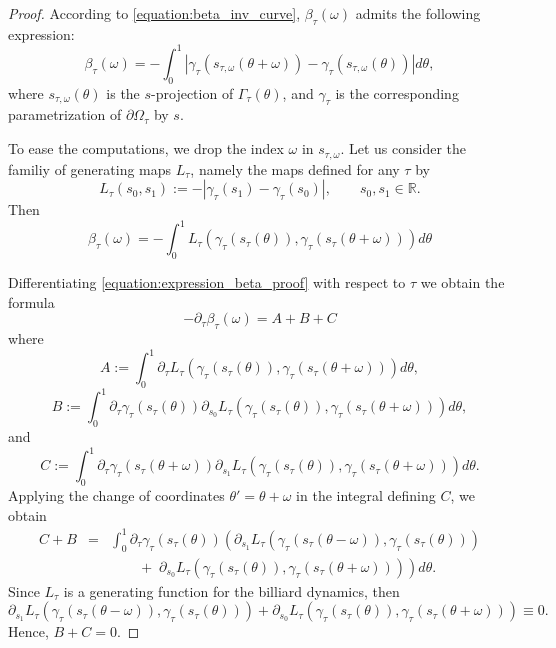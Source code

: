 \documentclass[10pt,a4paper]{amsart}
\newcommand{\RR}{\mathbb{R}}
\begin{document}
\begin{proof}%
According to \eqref{equation:beta_inv_curve}, $\beta_{\tau}(\omega)$ admits the following expression:
\[
\beta_{\tau}(\omega) = -\int_0^1|\gamma_{\tau}(s_{\tau,\omega}(\theta+\omega))-\gamma_{\tau}(s_{\tau,\omega}(\theta))|d\theta,
\]
where $s_{\tau,\omega}(\theta)$ is the $s$-projection of $\Gamma_{\tau}(\theta)$, and $\gamma_{\tau}$ is the corresponding parametrization of $\partial\Omega_{\tau}$ by $s$.

To ease the computations, we drop the index $\omega$ in $s_{\tau,\omega}$. Let us consider the familiy of generating maps $L_{\tau}$, namely the maps defined for any $\tau$ by
\[
L_{\tau}(s_0,s_1) := -|\gamma_{\tau}(s_1)-\gamma_{\tau}(s_0)|,\qquad s_0,s_1\in\RR.
\]
Then
\begin{equation}
\label{equation:expression_beta_proof}
\beta_{\tau}(\omega) = -\int_0^{1}L_{\tau}(\gamma_{\tau}(s_{\tau}(\theta)),\gamma_{\tau}(s_{\tau}(\theta+\omega)))d\theta
\end{equation}

Differentiating \eqref{equation:expression_beta_proof} with respect to $\tau$ we obtain the formula
\[
-\partial_{\tau}\beta_{\tau}(\omega) = A+B+C
\]
where
\[
A := \int_0^{1} \partial_{\tau} L_{\tau}(\gamma_{\tau}(s_{\tau}(\theta)),\gamma_{\tau}(s_{\tau}(\theta+\omega)))d\theta,
\]
\[
B := \int_0^{1}
\partial_{\tau}\gamma_{\tau}(s_{\tau}(\theta)) \partial_{s_0}L_{\tau}(\gamma_{\tau}(s_{\tau}(\theta)),\gamma_{\tau}(s_{\tau}(\theta+\omega)))d\theta,
\]
and 
\[
C := \int_0^{1}
\partial_{\tau}\gamma_{\tau}(s_{\tau}(\theta+\omega)) \partial_{s_1}L_{\tau}(\gamma_{\tau}(s_{\tau}(\theta)),\gamma_{\tau}(s_{\tau}(\theta+\omega)))d\theta.
\]
Applying the change of coordinates $\theta'=\theta+\omega$ in the integral defining $C$, we obtain
\begin{eqnarray*}
C+B &=& \int_0^{1}
\partial_{\tau}\gamma_{\tau}(s_{\tau}(\theta))
\left( 
\partial_{s_1}L_{\tau}(\gamma_{\tau}(s_{\tau}(\theta-\omega)),\gamma_{\tau}(s_{\tau}(\theta)))\right. \\
&& \left. \qquad + \;
\partial_{s_0}L_{\tau}(\gamma_{\tau}(s_{\tau}(\theta)),\gamma_{\tau}(s_{\tau}(\theta+\omega)))
\right)
d\theta. 
\end{eqnarray*}
Since $L_\tau$ is a generating function for the billiard dynamics, then
\[
\partial_{s_1}L_{\tau}(\gamma_{\tau}(s_{\tau}(\theta-\omega)),\gamma_{\tau}(s_{\tau}(\theta)))
+
\partial_{s_0}L_{\tau}(\gamma_{\tau}(s_{\tau}(\theta)),\gamma_{\tau}(s_{\tau}(\theta+\omega))) \equiv 0.
\]
Hence, $B+C=0$. 


\end{proof}
\end{document}

